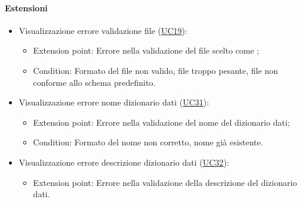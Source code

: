 \paragraph*{Estensioni}
\begin{itemize}
  \item Visualizzazione errore validazione file (\hyperref[UC19]{UC19}):
  \begin{itemize}
    \item Extension point: Errore nella validazione del file scelto come ;
    \item Condition: Formato del file non valido, file troppo pesante, file non conforme allo schema predefinito.
  \end{itemize}
  \item Visualizzazione errore nome dizionario dati (\hyperref[UC31]{UC31}):
  \begin{itemize}
    \item Extension point: Errore nella validazione del nome del dizionario dati;
    \item Condition: Formato del nome non corretto, nome già esistente.
  \end{itemize}
  \item Visualizzazione errore descrizione dizionario dati (\hyperref[UC32]{UC32}):
  \begin{itemize}
    \item Extension point: Errore nella validazione della descrizione del dizionario dati.
  \end{itemize}
\end{itemize}
